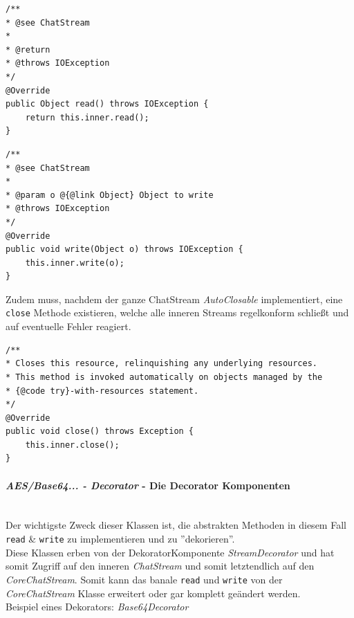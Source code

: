 			\begin{minipage}{.5\textwidth}
				\begin{lstlisting}[style=JavaL, caption={read - StreamDecorator}]
/**
* @see ChatStream
*
* @return
* @throws IOException
*/
@Override
public Object read() throws IOException {
	return this.inner.read();
}
				\end{lstlisting}
			\end{minipage}%
			\begin{minipage}{.5\textwidth}
				\begin{lstlisting}[style=JavaR, caption={write - StreamDecorator}]
/**
* @see ChatStream
*
* @param o @{@link Object} Object to write
* @throws IOException
*/
@Override
public void write(Object o) throws IOException {
	this.inner.write(o);
}
				\end{lstlisting}
			\end{minipage}
			
			Zudem muss, nachdem der ganze ChatStream \textit{AutoClosable} implementiert, eine \texttt{close} Methode existieren, welche alle inneren Streams regelkonform schließt und auf eventuelle Fehler reagiert.
			
			\begin{lstlisting}[style=JavaG, caption={close StreamDecorator}]
/**
* Closes this resource, relinquishing any underlying resources.
* This method is invoked automatically on objects managed by the
* {@code try}-with-resources statement.
*/
@Override
public void close() throws Exception {
	this.inner.close();
}
			\end{lstlisting}
			

\clearpage


			\paragraph{\textit{AES/Base64... - Decorator} - Die Decorator Komponenten}\mbox{}
			\vspace{0.15cm}\\
			Der wichtigste Zweck dieser Klassen ist, die abstrakten Methoden in diesem Fall \texttt{read} \& \texttt{write} zu implementieren und zu ''dekorieren''.\\
			Diese Klassen erben von der DekoratorKomponente \textit{StreamDecorator} und hat somit Zugriff auf den inneren \textit{ChatStream} und somit letztendlich auf den \textit{CoreChatStream}. Somit kann das banale \texttt{read} und \texttt{write} von der \textit{CoreChatStream} Klasse erweitert oder gar komplett geändert werden.\\
			Beispiel eines Dekorators: \textit{Base64Decorator}
			
